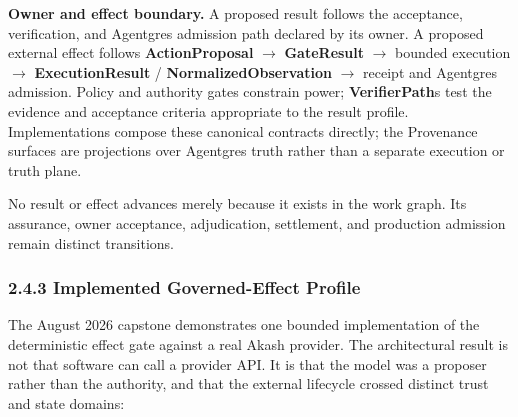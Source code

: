 \documentclass[
  11pt,
]{article}
\begin{document}
\textbf{Owner and effect boundary.} A proposed result follows the acceptance,
verification, and Agentgres admission path declared by its owner. A proposed
external effect follows \textbf{ActionProposal} $\rightarrow$
\textbf{GateResult} $\rightarrow$ bounded execution $\rightarrow$
\textbf{ExecutionResult} / \textbf{NormalizedObservation} $\rightarrow$
receipt and Agentgres admission. Policy and authority gates constrain power;
\textbf{VerifierPath}s test the evidence and acceptance criteria appropriate to
the result profile. Implementations compose these canonical contracts directly;
the Provenance surfaces are projections over Agentgres truth rather than a
separate execution or truth plane.

No result or effect advances merely because it exists in the work graph. Its
assurance, owner acceptance, adjudication, settlement, and production admission
remain distinct transitions.

\hypertarget{implemented-governed-effect-profile}{%
\subsubsection{2.4.3 Implemented Governed-Effect
Profile}\label{implemented-governed-effect-profile}}

The August 2026 capstone demonstrates one bounded implementation of the
deterministic effect gate against a real Akash provider. The architectural
result is not that software can call a provider API. It is that the model was a
proposer rather than the authority, and that the external lifecycle crossed
distinct trust and state domains:

\begin{center}
\end{center}
\end{document}
